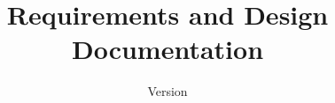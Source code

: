 \documentclass[a4paper, oneside]{scrreprt}
\begin{document}
    \title{Requirements and Design Documentation}
    \author{\vhListAllAuthors}
    \date{Version \vhCurrentVersion}
    \subject{ESEP -- Praktikum -- SS 2017}
    \maketitle

    \begin{versionhistory}
    \end{versionhistory}

    \tableofcontents

    
    
    
    
    
    
    
    
    
\end{document}

